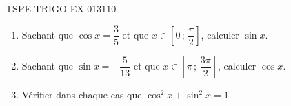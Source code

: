 \begin{exercice}{TSPE-TRIGO-EX-013}{1}{10}
\begin{enumerate}
  \item Sachant que $\cos x = \dfrac{3}{5}$ et que $x \in \left[0\,;\,\dfrac{\pi}{2}\right]$, calculer $\sin x$.
  \item Sachant que $\sin x = -\dfrac{5}{13}$ et que $x \in \left[\pi\,;\,\dfrac{3\pi}{2}\right]$, calculer $\cos x$.
  \item Vérifier dans chaque cas que $\cos^2 x + \sin^2 x = 1$.
\end{enumerate}
\end{exercice}
